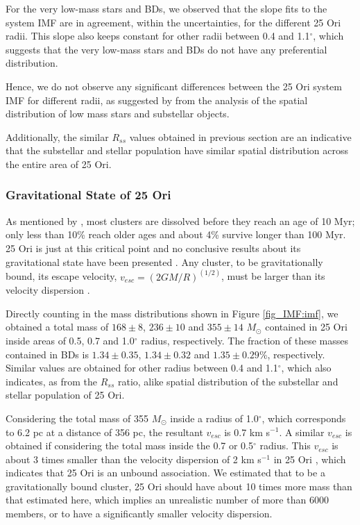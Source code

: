 \documentclass[12pt]{article}
\begin{document}
For the very low-mass stars and BDs, we observed that the slope fits to the system IMF are in agreement, within the uncertainties, for the different 25 Ori radii. This slope also keeps constant for other radii between 0.4 and 1.1$^\circ$, which suggests that the very low-mass stars and BDs do not have any preferential distribution. 

Hence, we do not observe any significant differences between the 25 Ori system IMF for different radii, as suggested by \citet{Downes2014} from the analysis of the spatial distribution of low mass stars and substellar objects.

Additionally, the similar $R_{ss}$ values obtained in previous section are an indicative that the substellar and stellar population have similar spatial distribution across the entire area of 25 Ori.

\subsubsection{Gravitational State of 25 Ori}
\label{sec_IMF:unbound}
As mentioned by \citet{Lada-Lada2003}, most clusters are dissolved before they reach an age of 10 Myr; only less than 10\% reach older ages and about 4\% survive longer than 100 Myr. 25 Ori is just at this critical point and no conclusive results about its gravitational state have been presented \citep{McGehee2006,Downes2014}. Any cluster, to be gravitationally bound, its escape velocity, $v_{esc}=(2GM/R)^{(1/2)}$, must be larger than its velocity dispersion \citep{Sherry2004}.

Directly counting in the mass distributions shown in Figure \ref{fig_IMF:imf}, we obtained a total mass of $168\pm8$, $236\pm10$ and $355\pm14$ $M_\odot$ contained in 25 Ori inside areas of 0.5, 0.7 and 1.0$^\circ$ radius, respectively. The fraction of these masses contained in BDs is $1.34\pm0.35$, $1.34\pm0.32$ and $1.35\pm0.29$\%, respectively. Similar values are obtained for other radius between 0.4 and 1.1$^\circ$, which also indicates, as from the $R_{ss}$ ratio, alike spatial distribution of the substellar and stellar population of 25 Ori.

Considering the total mass of 355 $M_\odot$ inside a radius of 1.0$^\circ$, which corresponds to 6.2 pc at a distance of 356 pc, the resultant $v_{esc}$ is 0.7 km s$^{-1}$. A similar $v_{esc}$ is obtained if considering the total mass inside the 0.7 or 0.5$^\circ$ radius. This $v_{esc}$ is about 3 times smaller than the velocity dispersion of 2 km s$^{-1}$ in 25 Ori \citep{Briceno2007}, which indicates that 25 Ori is an unbound association. We estimated that to be a gravitationally bound cluster, 25 Ori should have about 10 times more mass than that estimated here, which implies an unrealistic number of more than 6000 members, or to have a significantly smaller velocity dispersion.
\end{document}
